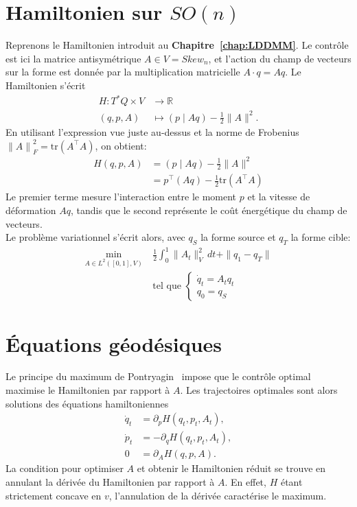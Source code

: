 \documentclass[12pt]{report}
\begin{document}
\section{Hamiltonien sur \texorpdfstring{$SO(n)$}{SO (n)}}
Reprenons le Hamiltonien introduit au \textbf{Chapitre~\ref{chap:LDDMM}}. Le contrôle est ici la matrice antisymétrique $A\in V=Skew_n$, et l'action du champ de vecteurs sur la forme est donnée par la multiplication matricielle $A\cdot q=Aq$. Le Hamiltonien s'écrit
\[
\begin{aligned}
H\colon T^*Q\times V&\longrightarrow\mathbb{R}\\
(q,p,A)&\longmapsto (p\mid Aq)-\frac{1}{2}\|A\|^2.
\end{aligned}
\]
En utilisant l'expression vue juste au-dessus et la norme de Frobenius ${\|A\|}^2_F=\mathrm{tr}(A^{\top}A)$, on obtient:
\[
\begin{aligned}
H(q,p,A)&=(p\mid Aq)-\frac{1}{2}\|A\|^2\\
&=p^{\top}(Aq)-\frac{1}{2}\mathrm{tr}(A^{\top}A)
\end{aligned}
\]
Le premier terme mesure l'interaction entre le moment $p$ et la vitesse de déformation $Aq$, tandis que le second représente le coût énergétique du champ de vecteurs.\\
Le problème variationnel s'écrit alors, avec $q_S$ la forme source et $q_T$ la forme cible:
\[
\begin{aligned}
\min_{A\in L^2([0,1],V)}~&\frac{1}{2}\int_{0}^{1}\|A_t\|_{V}^2\,dt+\|q_1-q_T\|\\
&\text{tel que }\left\{\begin{array}{ll}\dot q_t=A_{t}q_t\\ q_0=q_S\end{array}\right.
\end{aligned}
\]


\section{Équations géodésiques}
Le principe du maximum de Pontryagin~\cite{Zib21} impose que le contrôle optimal maximise le Hamiltonien par rapport à $A$. Les trajectoires optimales sont alors solutions des équations hamiltoniennes
\[
\begin{aligned}
\dot q_t&=\partial_p H(q_t,p_t,A_t),\\
\dot p_t&=-\partial_q H(q_t,p_t,A_t),\\
0&=\partial_A H(q,p,A).
\end{aligned}
\]
La condition pour optimiser $A$ et obtenir le Hamiltonien réduit se trouve en annulant la dérivée du Hamiltonien par rapport à $A$. En effet, $H$ étant strictement concave en $v$, l'annulation de la dérivée caractérise le maximum.
\end{document}
